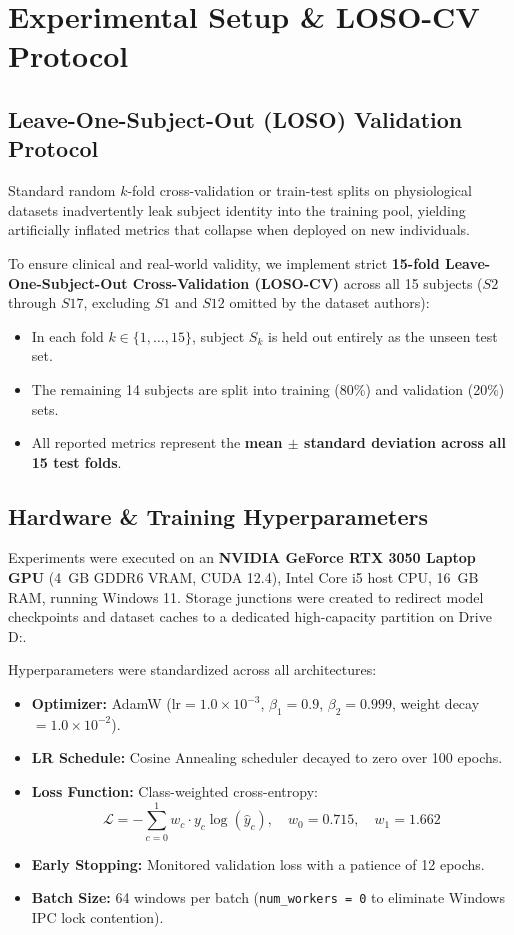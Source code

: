 \documentclass[conference]{IEEEtran}
\begin{document}
\section{Experimental Setup \& LOSO-CV Protocol}

\subsection{Leave-One-Subject-Out (LOSO) Validation Protocol}
Standard random $k$-fold cross-validation or train-test splits on physiological datasets inadvertently leak subject identity into the training pool, yielding artificially inflated metrics that collapse when deployed on new individuals. 

To ensure clinical and real-world validity, we implement strict \textbf{15-fold Leave-One-Subject-Out Cross-Validation (LOSO-CV)} across all 15 subjects ($S2$ through $S17$, excluding $S1$ and $S12$ omitted by the dataset authors):
\begin{itemize}
    \item In each fold $k \in \{1, \dots, 15\}$, subject $S_k$ is held out entirely as the unseen test set.
    \item The remaining 14 subjects are split into training (80\%) and validation (20\%) sets.
    \item All reported metrics represent the \textbf{mean $\pm$ standard deviation across all 15 test folds}.
\end{itemize}

\subsection{Hardware \& Training Hyperparameters}
Experiments were executed on an \textbf{NVIDIA GeForce RTX 3050 Laptop GPU} (4~GB GDDR6 VRAM, CUDA 12.4), Intel Core i5 host CPU, 16~GB RAM, running Windows 11. Storage junctions were created to redirect model checkpoints and dataset caches to a dedicated high-capacity partition on Drive D:.

Hyperparameters were standardized across all architectures:
\begin{itemize}
    \item \textbf{Optimizer:} AdamW ($\text{lr} = 1.0 \times 10^{-3}$, $\beta_1 = 0.9$, $\beta_2 = 0.999$, weight decay $= 1.0 \times 10^{-2}$).
    \item \textbf{LR Schedule:} Cosine Annealing scheduler decayed to zero over 100 epochs.
    \item \textbf{Loss Function:} Class-weighted cross-entropy:
    \begin{equation}
    \mathcal{L} = -\sum_{c=0}^1 w_c \cdot y_c \log(\hat{y}_c), \quad w_0 = 0.715, \quad w_1 = 1.662
    \end{equation}
    \item \textbf{Early Stopping:} Monitored validation loss with a patience of 12 epochs.
    \item \textbf{Batch Size:} 64 windows per batch (\texttt{num\_workers = 0} to eliminate Windows IPC lock contention).
\end{itemize}
\end{document}
